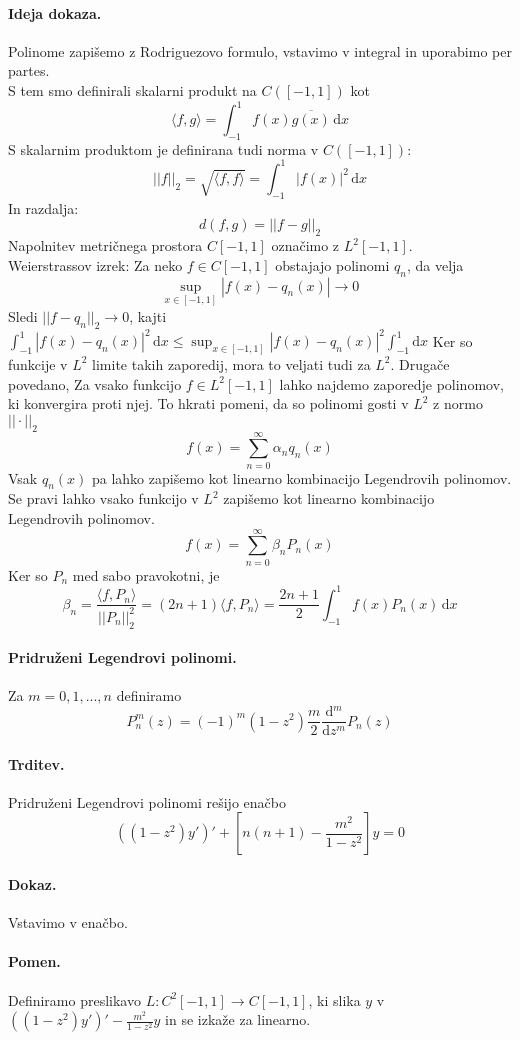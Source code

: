 \documentclass[a4paper]{article}
\newcommand{\dif}{\mathrm{d}}
\newcommand{\dd}[2]{\frac{\mathrm{d} {#1}}{\mathrm{d} {#2}}}
\newcommand{\fn}[3]{{#1}\colon {#2} \rightarrow {#3}}
\newcommand{\avg}[1]{\langle {#1} \rangle}
\newcommand{\Sum}[2][0]{\sum_{{#2} = {#1}}^{\infty}}
\begin{document}
\paragraph{Ideja dokaza.} Polinome zapišemo z Rodriguezovo formulo, vstavimo v integral in uporabimo per partes. \\[3mm]
S tem smo definirali skalarni produkt na $C([-1, 1])$ kot $$\avg{f, g} = \int_{-1}^{1} f(x)\overline{g(x)}\,\dif x$$
S skalarnim produktom je definirana tudi norma v $C([-1, 1])$:
$$||f||_2 = \sqrt{\avg{f, f}} = \int_{-1}^{1}|f(x)|^2 \, \dif x$$
In razdalja:
$$d(f, g) = ||f-g||_2$$
Napolnitev metričnega prostora $C[-1, 1]$ označimo z $L^2[-1, 1]$. \\[3mm]
Weierstrassov izrek: Za neko $f \in C[-1, 1]$ obstajajo polinomi $q_n$, da velja
$$\sup_{x \in [-1, 1]} |f(x) - q_n(x)| \to 0$$
Sledi $||f - q_n||_2 \to 0$, kajti $\displaystyle{\int_{-1}^{1} |f(x) - q_n(x)|^2 \,\dif x} \leq \sup_{x\in[-1, 1]} |f(x) - q_n(x)|^2\int_{-1}^{1}\dif x$
Ker so funkcije v $L^2$ limite takih zaporedij, mora to veljati tudi za $L^2$. Drugače povedano, Za vsako funkcijo $f \in L^2[-1, 1]$ lahko najdemo zaporedje polinomov, ki konvergira proti njej.
To hkrati pomeni, da so polinomi gosti v $L^2$ z normo $||\cdot||_2$
$$f(x) = \Sum{n} \alpha_n q_n(x)$$
Vsak $q_n(x)$ pa lahko zapišemo kot linearno kombinacijo Legendrovih polinomov. Se pravi lahko vsako funkcijo v $L^2$ zapišemo kot linearno kombinacijo Legendrovih polinomov.
$$f(x) = \Sum{n}\beta_nP_n(x)$$
Ker so $P_n$ med sabo pravokotni, je
$$\beta_n = \frac{\avg{f, P_n}}{||P_n||_2^2} = (2n + 1)\avg{f, P_n} = \frac{2n+1}{2}\int_{-1}^{1}f(x)P_n(x)\,\dif x$$
\paragraph{Pridruženi Legendrovi polinomi.} Za $m = 0, 1, ..., n$ definiramo
$$P_n^m(z) = (-1)^m(1-z^2)\frac{m}{2}\dd{^m}{z^m}P_n(z)$$
\paragraph{Trditev.} Pridruženi Legendrovi polinomi rešijo enačbo
$$((1-z^2)y')' + \left[n(n+1) - \frac{m^2}{1-z^2}\right]y = 0$$
\paragraph{Dokaz.} Vstavimo v enačbo.
\paragraph{Pomen.} Definiramo preslikavo $\fn{L}{C^2[-1, 1]}{C[-1, 1]}$, ki slika $y$ v $\displaystyle{\left((1-z^2)y'\right)' - \frac{m^2}{1-z^2}y}$ in se izkaže za linearno.
\end{document}
